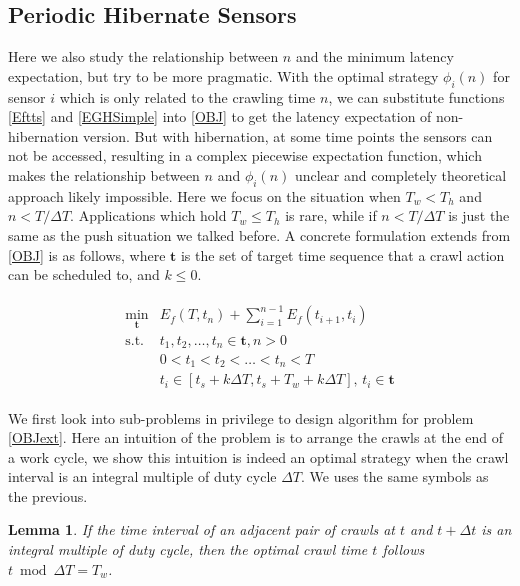 \documentclass[conference]{IEEEtran}
\newtheorem{lemma}{Lemma}
\begin{document}
\subsection{Periodic Hibernate Sensors}

Here we also study the relationship between $n$ and the minimum latency expectation, but try to be more pragmatic.
With the optimal strategy $\phi_i(n)$ for sensor $i$ which is only related to the crawling time $n$, we can substitute functions \eqref{Eftts} and \eqref{EGHSimple} into \eqref{OBJ} to get the latency expectation of non-hibernation version. 
But with hibernation, at some time points the sensors can not be accessed, resulting in a complex piecewise expectation function, which makes the relationship between $n$ and $\phi_i(n)$ unclear and completely theoretical approach likely impossible.
Here we focus on the situation when $T_w<T_h$ and $n<T/\Delta T$. Applications which hold $T_w\leq T_h$ is rare, while if $n<T/\Delta T$ is just the same as the push situation we talked before.
A concrete formulation extends from \ref{OBJ} is as follows, where $\mathbf{t}$ is the set of target time sequence that a crawl action can be scheduled to, and $k\leq 0$.

\begin{eqnarray}
\begin{array}{ll}
\min_{\mathbf{t}}& E_f(T,t_n)+\sum_{i=1}^{n-1}E_f(t_{i+1},t_{i}) \\
\text{s.t.} 
&t_1,t_2,\ldots,t_n\in \mathbf{t}, n>0\\
&0<t_1<t_2<\ldots<t_n<T\\
&t_i\in[t_s+k \Delta T, t_s+T_w+k\Delta T]\text{, }t_i\in{\mathbf{t}}
\end{array}\label{OBJext}
\end{eqnarray}


We first look into sub-problems in privilege to design algorithm for problem \ref{OBJext}.
Here an intuition of the problem is to arrange the crawls at the end of a work cycle, we show this intuition is indeed an optimal strategy when the crawl interval is an integral multiple of duty cycle $\Delta T$. We uses the same symbols as the previous.

\begin{lemma}
\label{intopt}
If the time interval of an adjacent pair of crawls at $t$ and $t+\Delta t$ is an integral multiple of duty cycle, then the optimal crawl time $t$ follows $t\bmod \Delta T=T_w$.
\end{lemma}
\end{document}
